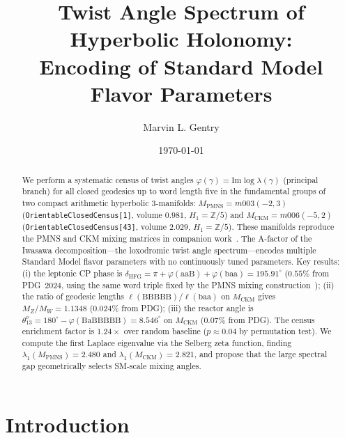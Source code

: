 \documentclass[11pt,a4paper]{article}
\theoremstyle{definition}
\theoremstyle{remark}
\newcommand{\Zfive}{\mathbb{Z}/5}
\newcommand{\MPMNS}{M_{\mathrm{PMNS}}}
\newcommand{\MCKM}{M_{\mathrm{CKM}}}
\newcommand{\degr}{^{\circ}}
\begin{document}
\title{Twist Angle Spectrum of Hyperbolic Holonomy:\\
Encoding of Standard Model Flavor Parameters}

\author[1]{Marvin L. Gentry}
\date{\today}
\maketitle

\begin{abstract}
We perform a systematic census of twist angles
$\varphi(\gamma) = \mathrm{Im}\log\lambda(\gamma)$ (principal branch)
for all closed geodesics up to word length five in the fundamental groups
of two compact arithmetic hyperbolic 3-manifolds:
$\MPMNS = m003(-2,3)$ (\texttt{OrientableClosedCensus[1]},
volume $0.981$, $H_1=\Zfive$) and
$\MCKM = m006(-5,2)$ (\texttt{OrientableClosedCensus[43]},
volume $2.029$, $H_1=\Zfive$).
These manifolds reproduce the PMNS and CKM mixing matrices in companion
work~\cite{Gentry:Unified}.
The A-factor of the Iwasawa decomposition---the loxodromic twist angle
spectrum---encodes multiple Standard Model flavor parameters with no
continuously tuned parameters.
Key results: (i) the leptonic CP phase is
$\delta_{\mathrm{HFG}} = \pi + \varphi(\mathrm{aaB})
+ \varphi(\mathrm{baa}) = 195.91\degr$
($0.55\%$ from PDG~2024, using the same word triple fixed by the
PMNS mixing construction~\cite{Gentry:CP});
(ii) the ratio of geodesic lengths $\ell(\mathrm{BBBBB})/\ell(\mathrm{baa})$
on $\MCKM$ gives $M_Z/M_W = 1.1348$ ($0.024\%$ from PDG);
(iii) the reactor angle is $\theta_{13}^\nu = 180\degr -
\varphi(\mathrm{BaBBBBB}) = 8.546\degr$ on $\MCKM$ ($0.07\%$ from PDG).
The census enrichment factor is $1.24\times$ over random baseline
($p \approx 0.04$ by permutation test).
We compute the first Laplace eigenvalue via the Selberg zeta function,
finding $\lambda_1(\MPMNS) = 2.480$ and $\lambda_1(\MCKM) = 2.821$,
and propose that the large spectral gap geometrically selects SM-scale
mixing angles.
\end{abstract}

\tableofcontents

\section{Introduction}
\label{sec:intro}
\end{document}
